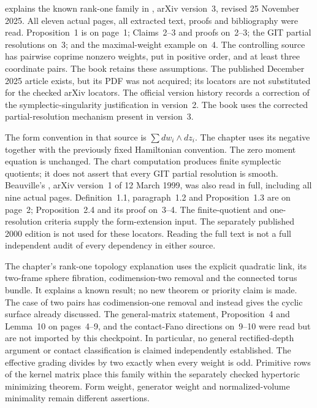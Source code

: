  explains the known rank-one
family in \cite{Namikawa25IsolatedHypertoricV3}, arXiv version~3,
revised 25 November 2025. All eleven actual pages, all extracted
text, proofs and bibliography were read. Proposition~1 is on
page~1; Claims~2--3 and proofs on~2--3; the GIT partial resolutions
on~3; and the maximal-weight example on~4. The controlling source
has pairwise coprime nonzero weights, put in positive order, and
at least three coordinate pairs. The book retains these assumptions.
The published December 2025 article exists, but its PDF was not
acquired; its locators are not substituted for the checked arXiv
locators. The official version history records a correction of the
symplectic-singularity justification in version~2. The book uses
the corrected partial-resolution mechanism present in version~3.

The form convention in that source is $\sum dw_i\wedge dz_i$.
The chapter uses its negative together with the previously fixed
Hamiltonian convention. The zero moment equation is unchanged.
The chart computation produces finite symplectic quotients; it
does not assert that every GIT partial resolution is smooth.
Beauville's \cite{Beauville99SymplecticV1}, arXiv version~1 of
12 March 1999, was also read in full, including all nine actual
pages. Definition~1.1, paragraph~1.2 and Proposition~1.3 are on
page~2; Proposition~2.4 and its proof on~3--4. The finite-quotient
and one-resolution criteria supply the form-extension input.
The separately published 2000 edition is not used for these
locators. Reading the full text is not a full independent audit
of every dependency in either source.

The chapter's rank-one topology explanation uses the explicit
quadratic link, its two-frame sphere fibration, codimension-two
removal and the connected torus bundle. It explains a known
result; no new theorem or priority claim is made. The case of
two pairs has codimension-one removal and instead gives the
cyclic surface already discussed. The general-matrix statement,
Proposition~4 and Lemma~10 on pages~4--9, and the contact-Fano
directions on~9--10 were read but are not imported by this
checkpoint. In particular, no general rectified-depth argument
or contact classification is claimed independently established.
The effective grading divides by two exactly when every weight
is odd. Primitive rows of the kernel matrix place this family
within the separately checked hypertoric minimizing theorem.
Form weight, generator weight and normalized-volume minimality
remain different assertions.

